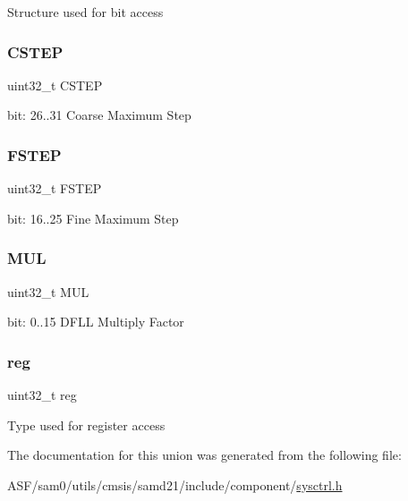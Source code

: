 Structure used for bit access \mbox{\label{union_s_y_s_c_t_r_l___d_f_l_l_m_u_l___type_a0055254231562e8bcf3398b805ffe2d7}} 
\subsubsection{\texorpdfstring{CSTEP}{CSTEP}}
{\footnotesize\ttfamily uint32\+\_\+t C\+S\+T\+EP}

bit\+: 26..31 Coarse Maximum Step \mbox{\label{union_s_y_s_c_t_r_l___d_f_l_l_m_u_l___type_a98da5e6ead5cef04e2152e73143efff7}} 
\subsubsection{\texorpdfstring{FSTEP}{FSTEP}}
{\footnotesize\ttfamily uint32\+\_\+t F\+S\+T\+EP}

bit\+: 16..25 Fine Maximum Step \mbox{\label{union_s_y_s_c_t_r_l___d_f_l_l_m_u_l___type_a225867261ccf5587a77b6a121044e6b1}} 
\subsubsection{\texorpdfstring{MUL}{MUL}}
{\footnotesize\ttfamily uint32\+\_\+t M\+UL}

bit\+: 0..15 D\+F\+LL Multiply Factor \mbox{\label{union_s_y_s_c_t_r_l___d_f_l_l_m_u_l___type_a6b91636401516a477989a336376d7b40}} 
\subsubsection{\texorpdfstring{reg}{reg}}
{\footnotesize\ttfamily uint32\+\_\+t reg}

Type used for register access 

The documentation for this union was generated from the following file\+:\begin{DoxyCompactItemize}
\item 
A\+S\+F/sam0/utils/cmsis/samd21/include/component/\mbox{\hyperlink{component_2sysctrl_8h}{sysctrl.\+h}}\end{DoxyCompactItemize}
